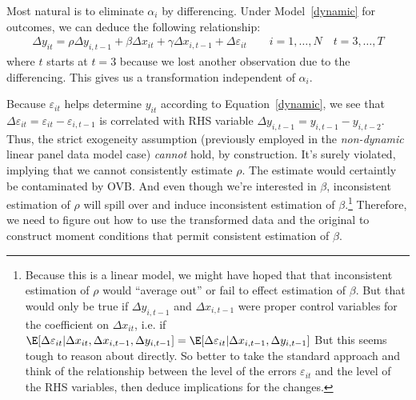 \documentclass[12pt]{article}
\theoremstyle{plain}
\theoremstyle{definition}
\theoremstyle{remark}
\begin{document}
Most natural is to eliminate $\alpha_i$ by differencing.
Under Model~\ref{dynamic} for outcomes, we can deduce the following
relationship:
\begin{align}
  \Delta y_{it}
  =
  \rho \Delta y_{i,t-1}
  + \beta \Delta x_{it}
  + \gamma \Delta x_{i,t-1}
  + \Delta \varepsilon_{it}
  \qquad
  i = 1,\ldots,N
  \quad
  t = 3,\ldots,T
  \label{dynamic_diffed}
\end{align}
where $t$ starts at $t=3$ because we lost another observation due to the
differencing.
This gives us a transformation independent of $\alpha_i$.

Because $\varepsilon_{it}$ helps determine $y_{it}$ according to
Equation~\ref{dynamic}, we see that $\Delta
\varepsilon_{it}=\varepsilon_{it}-\varepsilon_{i,t-1}$ is
correlated with RHS variable $\Delta y_{i,t-1}=y_{i,t-1}-y_{i,t-2}$.
Thus, the strict exogeneity assumption (previously employed in the
\emph{non-dynamic} linear panel data model case)
\emph{cannot} hold, by construction.
It's surely violated, implying that we cannot consistently estimate
$\rho$. The estimate would certaintly be contaminated by OVB.
And even though we're interested in $\beta$, inconsistent estimation of
$\rho$ will spill over and induce inconsistent estimation of
$\beta$.\footnote{%
  Because this is a linear model, we might have hoped that that
  inconsistent estimation of $\rho$ would ``average out'' or fail to
  effect estimation of $\beta$.
  But that would only be true if $\Delta y_{i,t-1}$ and
  $\Delta x_{i,t-1}$ were proper
  control variables for the coefficient on $\Delta x_{it}$, i.e.
  if $\E[\Delta \varepsilon_{it}|\Delta x_{it}, \Delta x_{i,t-1}, \Delta y_{i,t-1}]
  =\E[\Delta \varepsilon_{it}| \Delta x_{i,t-1},\Delta y_{i,t-1}]$
  But this seems tough to reason about directly.
  So better to take the standard approach and think of the relationship
  between the level of the errors $\varepsilon_{it}$ and the level of
  the RHS variables, then deduce implications for the changes.
}
Therefore, we need to figure out how to use the transformed data and the
original to construct moment conditions that permit consistent
estimation of $\beta$.
\end{document}
